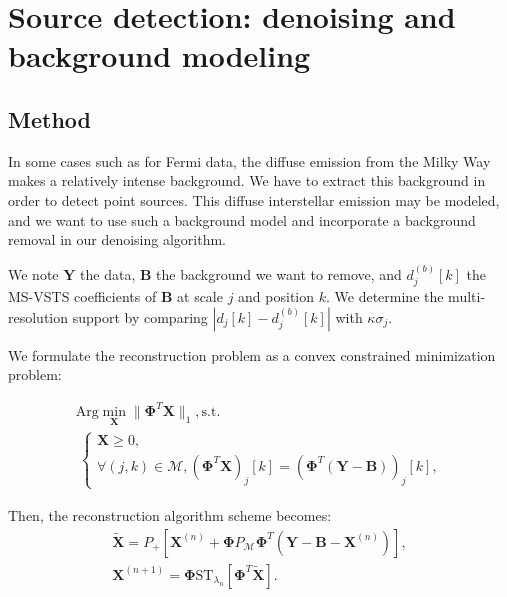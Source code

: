 \chapter{Source detection: denoising and background modeling}
\label{ch_background}


\section{Method}
In some cases such as for Fermi data, the diffuse emission from the Milky Way  makes a relatively intense background. We have to extract this background in order to detect point sources. This diffuse interstellar emission may be modeled, and we want to use such a background model and incorporate a background removal in our denoising algorithm.

We note $\mathbf{Y}$ the data, $\mathbf{B}$ the background we want to remove, and $d^{(b)}_{j}[k]$ the MS-VSTS coefficients of $\mathbf{B}$ at scale $j$ and position $k$. We determine the multi-resolution support by comparing $|d_j[k]-d^{(b)}_{j}[k]|$ with $\kappa \sigma_j$.

We formulate the reconstruction problem as a convex constrained minimization problem:

\begin{equation}
\label{bgr_eq34}
\begin{split}
\text{Arg} \min_{\mathbf{X}} \| \mathbf{ \Phi}^{T}\mathbf{X}\|_1,
\text{s.t.} \\ \: \left\{\begin{array}{c}\mathbf{X} \geqslant 0 , \\\forall (j,k)\in \mathcal{M},      (\mathbf{ \Phi}^{T}\mathbf{X})_j[k]=(\mathbf{ \Phi}^{T}(\mathbf{Y} - \mathbf{B}))_j[k] , \end{array}\right.
\end{split}
\end{equation}

Then, the reconstruction algorithm scheme becomes:
\begin{eqnarray}
\tilde{\mathbf{X}} = P_{+}[\mathbf{ X}^{(n)} + \mathbf{ \Phi} P_{\mathcal{M}} \mathbf{ \Phi}^{T} (\mathbf{ Y} - \mathbf{B} - \mathbf{ X}^{(n)})] , \\
\mathbf{X}^{(n+1)} = \mathbf{ \Phi}\text{ST}_{\lambda_n}[\mathbf{ \Phi}^{T}\tilde{\mathbf{X}}].
\end{eqnarray}

